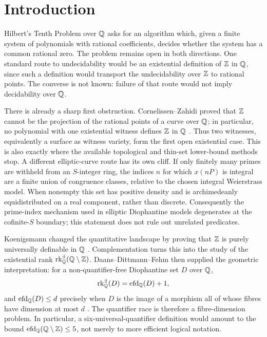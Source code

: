 \section{Introduction}

Hilbert's Tenth Problem over $\mathbb{Q}$ asks for an algorithm which, given a finite
system of polynomials with rational coefficients, decides whether the system
has a common rational zero.  The problem remains open in both directions.
One standard route to undecidability would be an existential definition of
$\mathbb{Z}$ in $\mathbb{Q}$, since such a definition would transport the undecidability over
$\mathbb{Z}$ to rational points.  The converse is not known: failure of that route
would not imply decidability over $\mathbb{Q}$.

There is already a sharp first obstruction.  Cornelissen--Zahidi proved that
$\mathbb{Z}$ cannot be the projection of the rational points of a curve over $\mathbb{Q}$;
in particular, no polynomial with one existential witness defines $\mathbb{Z}$ in
$\mathbb{Q}$ \cite{cz}.  Thus two witnesses, equivalently a surface as witness
variety, form the first open existential case.  This is also exactly where
the available topological and thin-set lower-bound methods stop.
A different elliptic-curve route has its own cliff.  If only finitely many
primes are withheld from an $S$-integer ring, the indices $n$ for which
$x(nP)$ is integral are a finite union of congruence classes, relative to the
chosen integral Weierstrass model.  When nonempty this set has positive
density and is archimedeanly equidistributed on a real component, rather than
discrete.  Consequently the prime-index mechanism used in elliptic
Diophantine models degenerates at the cofinite-$S$ boundary; this statement
does not rule out unrelated predicates.

Koenigsmann changed the quantitative landscape by proving that $\mathbb{Z}$ is
purely universally definable in $\mathbb{Q}$ \cite{koenigsmann}.
Complementation turns this into the study of the existential rank
$\operatorname{rk}^{\exists}_{\mathbb{Q}}(\mathbb{Q}\setminus\mathbb{Z})$.  Daans--Dittmann--Fehm
then supplied the geometric interpretation: for a non-quantifier-free
Diophantine set $D$ over $\mathbb{Q}$,
\[
  \operatorname{rk}^{\exists}_{\mathbb{Q}}(D)
  =\operatorname{efd}_{\mathbb{Q}}(D)+1,
\]
and $\operatorname{efd}_{\mathbb{Q}}(D)\le d$ precisely when $D$ is the image of a
morphism all of whose fibres have dimension at most $d$ \cite{ddf}.  The
quantifier race is therefore a fibre-dimension problem.  In particular, a
six-universal-quantifier definition would amount to the bound
$\operatorname{efd}_{\mathbb{Q}}(\mathbb{Q}\setminus\mathbb{Z})\le5$, not merely to more efficient
logical notation.

